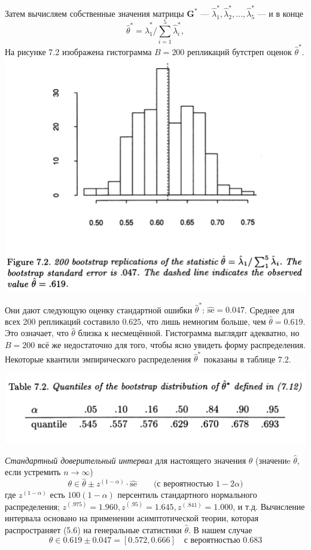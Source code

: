 Затем вычисляем собственные значения матрицы $\mathbf G^*$ --- $\hat \lambda_1^*, \hat \lambda_2^*,\ldots,\hat \lambda_5^* $ --- и в конце
\begin{equation}
	\hat \theta^* = \hat \lambda_1^* / \sum_{i = 1}^5 \hat \lambda_i^*,
\end{equation}
На рисунке 7.2 изображена гистограмма $B = 200$ репликаций бутстреп оценок $\hat \theta^*$. 
\newline
\includegraphics[width=0.85\linewidth]{6/f72.png}
\newline
\setcounter{figure}{2}

Они дают следующую оценку стандартной ошибки $\hat \theta^*$: $\widehat{\text{se}} = 0.047$. Среднее для всех 200 репликаций составило $0.625$, что лишь немногим больше, чем $\hat \theta = 0.619.$ Это означает, что $\hat \theta$ близка к несмещённой. Гистограмма выглядит адекватно, но $B = 200$ всё же недостаточно для того, чтобы ясно увидеть форму распределения. Некоторые квантили эмпирического распределения $\hat \theta^*$ показаны в таблице 7.2.

\noindent
\includegraphics[width=0.9\linewidth]{6/t72.png}
\newline
\setcounter{table}{2}

\textit{Стандартный доверительный интервал} для настоящего значения $\theta$ (значениe $\hat \theta$, если устремить $n \rightarrow \infty$)
\begin{equation}
  \theta \in \hat \theta \pm z^{(1-\alpha)} \cdot \widehat{\text{se}} \qquad \text{(с вероятностью $1 - 2\alpha$)}
\end{equation}
где $z^{(1-\alpha)}$ есть $100(1- \alpha)$ персентиль стандартного нормального распределения; $z^{(.975)} = 1.960,z^{(.95)} = 1.645,z^{(.841)} = 1.000$, и т.д. Вычисление интервала основано на применении асимптотической теории, которая распространяет (5.6) на генеральные статистики $\hat \theta$. В нашем случае 
$$
\theta \in 0.619 \pm 0.047 = [ 0.572,0.666]\quad \text{с вероятностью }  0.683 
$$


